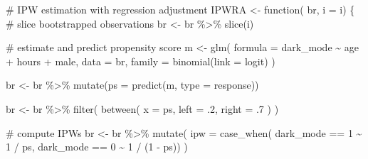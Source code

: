 \documentclass[
  a4paper,
  DIV=11,
  oneside]{scrreprt}
\newenvironment{Shaded}{\begin{snugshade}}{\end{snugshade}}
\newcommand{\AttributeTok}[1]{\textcolor[rgb]{0.40,0.45,0.13}{#1}}
\newcommand{\CommentTok}[1]{\textcolor[rgb]{0.37,0.37,0.37}{#1}}
\newcommand{\ControlFlowTok}[1]{\textcolor[rgb]{0.00,0.23,0.31}{#1}}
\newcommand{\DecValTok}[1]{\textcolor[rgb]{0.68,0.00,0.00}{#1}}
\newcommand{\FunctionTok}[1]{\textcolor[rgb]{0.28,0.35,0.67}{#1}}
\newcommand{\NormalTok}[1]{\textcolor[rgb]{0.00,0.23,0.31}{#1}}
\newcommand{\OtherTok}[1]{\textcolor[rgb]{0.00,0.23,0.31}{#1}}
\newcommand{\SpecialCharTok}[1]{\textcolor[rgb]{0.37,0.37,0.37}{#1}}
\newcommand{\StringTok}[1]{\textcolor[rgb]{0.13,0.47,0.30}{#1}}
\begin{document}
\begin{Shaded}
\begin{Highlighting}[]
\CommentTok{\# IPW estimation with regression adjustment}
\NormalTok{IPWRA }\OtherTok{\textless{}{-}} \ControlFlowTok{function}\NormalTok{(}
\NormalTok{    br, }
    \AttributeTok{i =}\NormalTok{ i) \{}
    \CommentTok{\# slice bootstrapped observations}
\NormalTok{    br }\OtherTok{\textless{}{-}}\NormalTok{ br }\SpecialCharTok{\%\textgreater{}\%} 
      \FunctionTok{slice}\NormalTok{(i)}
    
    \CommentTok{\# estimate and predict propensity score}
\NormalTok{    m }\OtherTok{\textless{}{-}} \FunctionTok{glm}\NormalTok{(}
      \AttributeTok{formula =}\NormalTok{ dark\_mode }\SpecialCharTok{\textasciitilde{}}\NormalTok{ age }\SpecialCharTok{+}\NormalTok{ hours }\SpecialCharTok{+}\NormalTok{ male,}
      \AttributeTok{data =}\NormalTok{ br, }
      \AttributeTok{family =} \FunctionTok{binomial}\NormalTok{(}\AttributeTok{link =} \StringTok{\textquotesingle{}logit\textquotesingle{}}\NormalTok{)}
\NormalTok{    )}
    
\NormalTok{    br }\OtherTok{\textless{}{-}}\NormalTok{ br }\SpecialCharTok{\%\textgreater{}\%}
        \FunctionTok{mutate}\NormalTok{(}\AttributeTok{ps =} \FunctionTok{predict}\NormalTok{(m, }\AttributeTok{type =} \StringTok{\textquotesingle{}response\textquotesingle{}}\NormalTok{))}

\NormalTok{    br }\OtherTok{\textless{}{-}}\NormalTok{ br }\SpecialCharTok{\%\textgreater{}\%}
      \FunctionTok{filter}\NormalTok{(}
        \FunctionTok{between}\NormalTok{(}
          \AttributeTok{x =}\NormalTok{ ps,}
          \AttributeTok{left =}\NormalTok{ .}\DecValTok{2}\NormalTok{,}
          \AttributeTok{right =}\NormalTok{ .}\DecValTok{7}
\NormalTok{          )}
\NormalTok{    )}
    
    \CommentTok{\# compute IPWs}
\NormalTok{    br }\OtherTok{\textless{}{-}}\NormalTok{ br }\SpecialCharTok{\%\textgreater{}\%}
      \FunctionTok{mutate}\NormalTok{(}
        \AttributeTok{ipw =} \FunctionTok{case\_when}\NormalTok{(}
\NormalTok{          dark\_mode }\SpecialCharTok{==} \DecValTok{1} \SpecialCharTok{\textasciitilde{}} \DecValTok{1} \SpecialCharTok{/}\NormalTok{ ps,}
\NormalTok{          dark\_mode }\SpecialCharTok{==} \DecValTok{0} \SpecialCharTok{\textasciitilde{}} \DecValTok{1} \SpecialCharTok{/}\NormalTok{ (}\DecValTok{1} \SpecialCharTok{{-}}\NormalTok{ ps))}
\NormalTok{      )}
    

\end{Highlighting}
\end{Shaded}
\end{document}
